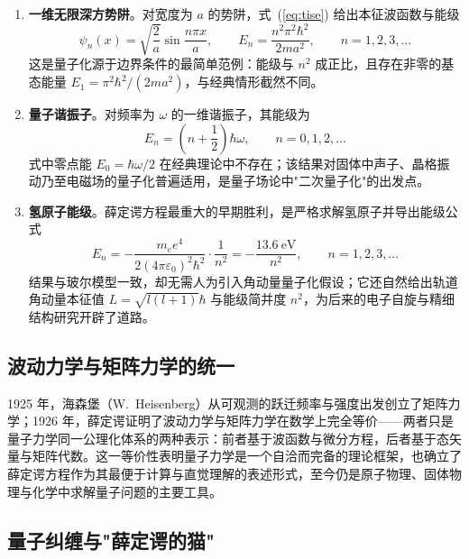 \documentclass{ctexart} %
\begin{document}
\begin{enumerate}
    \item \textbf{一维无限深方势阱}。对宽度为 $a$ 的势阱，式~(\ref{eq:tise}) 给出本征波函数与能级
    \begin{equation}
        \psi_n(x) = \sqrt{\frac{2}{a}}\sin\frac{n\pi x}{a},\qquad
        E_n = \frac{n^2\pi^2\hbar^2}{2ma^2},\qquad n = 1,2,3,\ldots
        \label{eq:well}
    \end{equation}
    这是量子化源于边界条件的最简单范例：能级与 $n^2$ 成正比，且存在非零的基态能量 $E_1 = \pi^2\hbar^2/(2ma^2)$，与经典情形截然不同。
    \item \textbf{量子谐振子}。对频率为 $\omega$ 的一维谐振子，其能级为
    \begin{equation}
        E_n = \left(n + \frac{1}{2}\right)\hbar\omega,\qquad n = 0,1,2,\ldots
        \label{eq:ho}
    \end{equation}
    式中零点能 $E_0 = \hbar\omega/2$ 在经典理论中不存在；该结果对固体中声子、晶格振动乃至电磁场的量子化普遍适用，是量子场论中"二次量子化"的出发点。
    \item \textbf{氢原子能级}。薛定谔方程最重大的早期胜利，是严格求解氢原子并导出能级公式
    \begin{equation}
        E_n = -\frac{m_e e^4}{2(4\pi\varepsilon_0)^2\hbar^2}\cdot\frac{1}{n^2}
        = -\frac{13.6~\mathrm{eV}}{n^2},\qquad n = 1,2,3,\ldots
        \label{eq:hydrogen}
    \end{equation}
    结果与玻尔模型一致，却无需人为引入角动量量子化假设；它还自然给出轨道角动量本征值 $L = \sqrt{l(l+1)}\hbar$ 与能级简并度 $n^2$，为后来的电子自旋与精细结构研究开辟了道路\cite{schrodinger1926,griffithsqm2018}。
\end{enumerate}

\subsection*{波动力学与矩阵力学的统一}

1925 年，海森堡（W.~Heisenberg）从可观测的跃迁频率与强度出发创立了矩阵力学；1926 年，薛定谔证明了波动力学与矩阵力学在数学上完全等价\cite{schrodinger1926,griffithsqm2018}——两者只是量子力学同一公理化体系的两种表示：前者基于波函数与微分方程，后者基于态矢量与矩阵代数。这一等价性表明量子力学是一个自洽而完备的理论框架，也确立了薛定谔方程作为其最便于计算与直觉理解的表述形式，至今仍是原子物理、固体物理与化学中求解量子问题的主要工具。

\subsection*{量子纠缠与"薛定谔的猫"}
\end{document}
